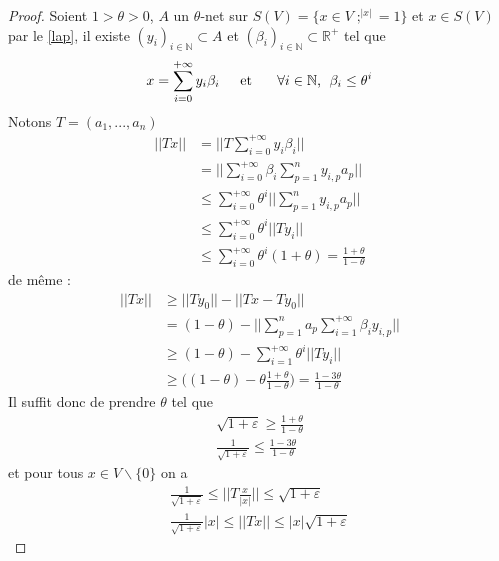 \documentclass[12pt]{article}
\theoremstyle{definition}
\begin{document}
\begin{proof} 
	Soient $1>\theta>0$, $A$ un $\theta$-net sur $S(V)=\big\{x\in V \; ;^|x|=1\big\}$ et $x\in S(V)$ par le \cref{lap},  il existe $(y_i)_{i\in\mathbb{N}}\subset A$ et $(\beta_i)_{i\in\mathbb{N}}\subset \mathbb{R}^{+}$ tel que 
	\begin{equation*}
	x = \sum_{i=0}^{+\infty}y_i \beta_i \text{\hspace{4mm} et \hspace{4mm} $\forall i\in \mathbb{N}$, }\; \beta_i\leq \theta^i
	\end{equation*}
	Notons $T=(a_1,...,a_n)$
	\begin{align*}
	||Tx|| &= \big|\big| T\sum_{i=0}^{+\infty}y_i \beta_i\big|\big|\\
	&=  \big|\big| \sum_{i=0}^{+\infty}\beta_i \sum_{p=1}^{n}y_{i,p}a_p \big|\big|\\
	&\leq \sum_{i=0}^{+\infty}\theta^i ||\sum_{p=1}^{n}y_{i,p}a_p||\\
	&\leq \sum_{i=0}^{+\infty}\theta^i ||Ty_i||\\
	& \leq  \sum_{i=0}^{+\infty}\theta^i (1+\theta)=\frac{1+\theta}{1-\theta}
	\end{align*}
	de même :
	\begin{align*}
	||Tx|| &\geq||Ty_0||- ||Tx-Ty_0||\\
	&= (1-\theta) - ||\sum_{p=1}^{n}a_p\sum_{i=1}^{+\infty}\beta_i y_{i,p}||\\
	&\geq (1-\theta)- \sum_{i=1}^{+\infty}\theta^i ||Ty_i||\\
	&\geq \big((1-\theta)- \theta\frac{1+\theta}{1-\theta}\big)=  \frac{1-3\theta}{1-\theta}
	\end{align*}
	Il suffit donc de prendre $\theta$ tel que
	\begin{equation*}
	\begin{array}{cc}
	\sqrt{1+\varepsilon}\geq \frac{1+\theta}{1-\theta}\\
	\frac{1}{\sqrt{1+\varepsilon}}\leq \frac{1-3\theta}{1-\theta}
	\end{array}
	\end{equation*}
	et pour tous $x\in V \backslash\{0\}$ on a 
	\begin{equation*}
	\begin{array}{cc}
	\frac{1}{\sqrt{1+\varepsilon}}\leq\big|\big|T\frac{x}{|x|}\big|\big|\leq  \sqrt{1+\varepsilon}\\
	\frac{1}{\sqrt{1+\varepsilon}}|x|\leq||Tx||\leq |x|\sqrt{1+\varepsilon}
	\end{array}
	\end{equation*}

\end{proof}
\end{document}
